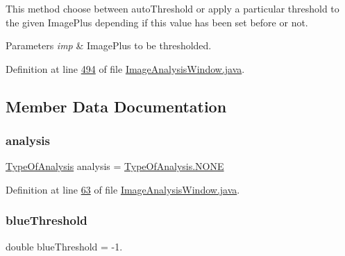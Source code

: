 This method choose between auto\+Threshold or apply a particular threshold to the given Image\+Plus depending if this value has been set before or not.


\begin{DoxyParams}{Parameters}
{\em imp} & Image\+Plus to be thresholded. \\
\hline
\end{DoxyParams}


Definition at line \hyperlink{_image_analysis_window_8java_source_l00494}{494} of file \hyperlink{_image_analysis_window_8java_source}{Image\+Analysis\+Window.\+java}.



\subsection{Member Data Documentation}
\hypertarget{classgui_1_1_image_analysis_window_ae0c6f15cfb3c589fb7817738e51998bd}{}\label{classgui_1_1_image_analysis_window_ae0c6f15cfb3c589fb7817738e51998bd} 
\subsubsection{\texorpdfstring{analysis}{analysis}}
{\footnotesize\ttfamily \hyperlink{enumgui_1_1_image_analysis_window_1_1_type_of_analysis}{Type\+Of\+Analysis} analysis = \hyperlink{enumgui_1_1_image_analysis_window_1_1_type_of_analysis_a899caa602e4fff675b17cdbab33607ec}{Type\+Of\+Analysis.\+N\+O\+NE}\hspace{0.3cm}{\ttfamily [private]}}



Definition at line \hyperlink{_image_analysis_window_8java_source_l00063}{63} of file \hyperlink{_image_analysis_window_8java_source}{Image\+Analysis\+Window.\+java}.

\hypertarget{classgui_1_1_image_analysis_window_ae4ebd2945cd8f03b803803928d99dcad}{}\label{classgui_1_1_image_analysis_window_ae4ebd2945cd8f03b803803928d99dcad} 
\subsubsection{\texorpdfstring{blue\+Threshold}{blueThreshold}}
{\footnotesize\ttfamily double blue\+Threshold = -\/1.\hspace{0.3cm}{\ttfamily [protected]}}



